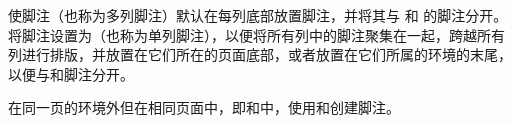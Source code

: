 
% 
% 

% 
使脚注{\em\Uidx\mcfnote}（也称为多列脚注）默认在每列底部放置脚注，并将其与 \Preenv{} 和 \Postenv{} 的脚注分开。
% 
将脚注设置为{\em\Uidx\scfnote}（也称为单列脚注），以便将所有列中的脚注聚集在一起，跨越所有列进行排版，并放置在它们所在的页面底部，或者放置在它们所属的环境的末尾，以便与\Preenv{}和\Postenv{}脚注分开。

在同一页的环境外但在相同页面中，即\Preenv{}和\postenv{}中，使用\Scfnote{}和{\em\Uidx\mgfnote}创建脚注。
% 

